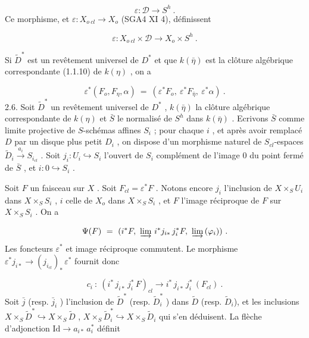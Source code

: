 \begin{equation*}
\varepsilon : \mathcal{D} \longrightarrow S^h \ .
\end{equation*}
Ce morphisme, et $\varepsilon : X_{o\ cl} \longrightarrow X_o$ (SGA4 XI 4), définissent

\begin{equation*}
\varepsilon : X_{o\ cl} \times \mathcal{D} \longrightarrow X_o \times S^h \ .
\end{equation*}


Si $\widetilde{D}^*$ est un revêtement universel de $D^*$ et que $k(\bar{\eta})$ est la clôture algébrique correspondante (1.1.10) de $k(\eta)$ , on a

\begin{equation*}
\varepsilon^*(F_o, F_\eta, \alpha) \ = \ (\varepsilon^* F_o, \ \varepsilon^* F_{\bar{\eta}}, \ \varepsilon^* \alpha) \ .
\end{equation*}
2.6. Soit $\widetilde{D}^*$ un revêtement universel de $D^*$ , $k(\bar{\eta})$ la clôture algébrique correspondante de $k(\eta)$ et $\bar{S}$ le normalisé de $S^h$ dans $k(\bar{\eta})$ . Ecrivons $\bar{S}$ comme limite projective de $S$-schémas affines $S_i$ ; pour chaque $i$ , et après avoir remplacé $D$ par un disque plus petit $D_i$ , on dispose d'un morphisme naturel de $S_{cl}$-espaces $\widetilde{D}_i \xrightarrow{\ a_i\ } S_{i_{cl}}$ . Soit $j_i : U_i \hookrightarrow S_i$ l'ouvert de $S_i$ complément de l'image $0$ du point fermé de $\bar{S}$ , et $i : 0 \hookrightarrow S_i$ .

Soit $F$ un faisceau sur $X$ . Soit $F_{cl} = \varepsilon^* F$ . Notons encore $j_i$ l'inclusion de $X \times_S U_i$ dans $X \times_S S_i$ , $i$ celle de $X_o$ dans $X \times_S S_i$ , et $F$ l'image réciproque de $F$ sur $X \times_S S_i$ . On a

\begin{equation*}
\Psi(F) \ = \ (i^* F, \ \varinjlim \, i^* j_{i*} \, j_i^* F, \ \varinjlim \, (\varphi_i)) \ .
\end{equation*}
Les foncteurs $\varepsilon^*$ et image réciproque commutent. Le morphisme $\varepsilon^* j_{i*} \longrightarrow (j_{i_{cl}})_* \, \varepsilon^*$ fournit donc

\begin{equation*}
c_i \ : \ (i^* \, j_{i*} \, j_i^* \, F)_{cl} \longrightarrow i^* \, j_{i*} \, j_i^* \, (F_{cl}) \ .
\end{equation*}
Soit $\bar{j}$ (resp. $\bar{j}_i$ ) l'inclusion de $\widetilde{D}^*$ (resp. $\widetilde{D}^*_i$ ) dans $\widetilde{D}$ (resp. $\widetilde{D}_i$), et les inclusions $X \times_S \widetilde{D}^* \hookrightarrow X \times_S \widetilde{D}$ , $X \times_S \widetilde{D}^*_i \hookrightarrow X \times_S \widetilde{D}_i$ qui s'en déduisent. La flèche d'adjonction $\mathrm{Id} \longrightarrow a_{i*} \, a_i^*$ définit

